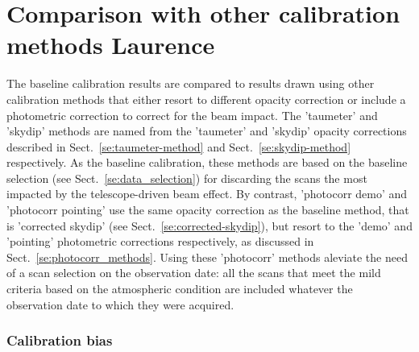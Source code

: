

\section{Comparison with other calibration methods {\color{LimeGreen} Laurence}}
\label{se:photometry_others}

The baseline calibration results are compared to
results drawn using other calibration methods that either resort to different
opacity correction or include a photometric correction to correct for
the beam impact. The 'taumeter' and 'skydip' methods are named from
the 'taumeter' and 'skydip' opacity corrections described in
Sect.~\ref{se:taumeter-method} and Sect.~\ref{se:skydip-method}
respectively. As the baseline calibration, these methods are based on
the baseline selection (see Sect.~\ref{se:data_selection}) for
discarding the scans the most impacted by the telescope-driven beam
effect. By contrast, 'photocorr demo' and 'photocorr pointing' use the
same opacity correction as the baseline method, that is 'corrected
skydip' (see Sect.~\ref{se:corrected-skydip}), but resort to the
'demo' and 'pointing' photometric corrections respectively, as
discussed in Sect.~\ref{se:photocorr_methods}. Using these
'photocorr' methods aleviate the need of a scan selection on the
observation date: all the scans that meet the mild criteria based on
the atmospheric condition are included whatever the
observation date to which they were acquired. 

\subsubsection{Calibration bias}

